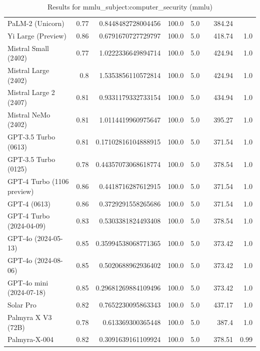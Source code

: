 \begin{table}[htp]
{\begin{tabular}{lrrrrrrr}
PaLM-2 (Unicorn) & 0.77 & 0.8448482728004456 & 100.0 & 5.0 &  & 384.24 &  \\
Yi Large (Preview) & 0.86 & 0.6791670727729797 & 100.0 & 5.0 &  & 418.74 & 1.0 \\
Mistral Small (2402) & 0.77 & 1.0222336649894714 & 100.0 & 5.0 &  & 424.94 & 1.0 \\
Mistral Large (2402) & 0.8 & 1.5353856110572814 & 100.0 & 5.0 &  & 424.94 & 1.0 \\
Mistral Large 2 (2407) & 0.81 & 0.9331179332733154 & 100.0 & 5.0 &  & 434.94 & 1.0 \\
Mistral NeMo (2402) & 0.81 & 1.0114419960975647 & 100.0 & 5.0 &  & 395.27 & 1.0 \\
GPT-3.5 Turbo (0613) & 0.81 & 0.17102816104888915 & 100.0 & 5.0 &  & 371.54 & 1.0 \\
GPT-3.5 Turbo (0125) & 0.78 & 0.44357073068618774 & 100.0 & 5.0 &  & 378.54 & 1.0 \\
GPT-4 Turbo (1106 preview) & 0.86 & 0.4418716287612915 & 100.0 & 5.0 &  & 371.54 & 1.0 \\
GPT-4 (0613) & 0.86 & 0.3729291558265686 & 100.0 & 5.0 &  & 371.54 & 1.0 \\
GPT-4 Turbo (2024-04-09) & 0.83 & 0.5303381824493408 & 100.0 & 5.0 &  & 378.54 & 1.0 \\
GPT-4o (2024-05-13) & 0.85 & 0.35994538068771365 & 100.0 & 5.0 &  & 373.42 & 1.0 \\
GPT-4o (2024-08-06) & 0.85 & 0.5020688962936402 & 100.0 & 5.0 &  & 373.42 & 1.0 \\
GPT-4o mini (2024-07-18) & 0.85 & 0.29681269884109496 & 100.0 & 5.0 &  & 373.42 & 1.0 \\
Solar Pro & 0.82 & 0.7652230095863343 & 100.0 & 5.0 &  & 437.17 & 1.0 \\
Palmyra X V3 (72B) & 0.78 & 0.613369300365448 & 100.0 & 5.0 &  & 387.4 & 1.0 \\
Palmyra-X-004 & 0.82 & 0.3091639161109924 & 100.0 & 5.0 &  & 378.51 & 0.99 \\
\bottomrule
\end{tabular}}
\caption{Results for mmlu_subject:computer_security (mmlu)}
\label{fig:mmlu_subject:computer_security (mmlu)}
\end{table}